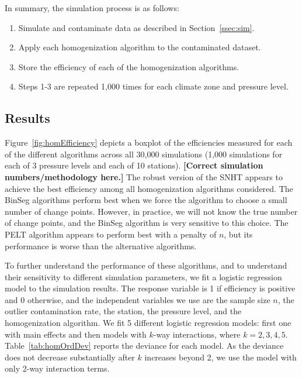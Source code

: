 \documentclass[12pt]{article}
\begin{document}
\begin{doublespacing}
In summary, the simulation process is as follows:

\begin{enumerate}
	\item Simulate and contaminate data as described in Section~\ref{ssec:sim}.
	\item Apply each homogenization algorithm to the contaminated dataset.
	\item Store the efficiency of each of the homogenization algorithms.
	\item Steps 1-3 are repeated 1,000 times for each climate zone and pressure level.
\end{enumerate}

\subsection{Results}

\label{sec:HomResults}


Figure~\ref{fig:homEfficiency} depicts a boxplot of the efficiencies measured for each of the different algorithms across all 30,000 simulations (1,000 simulations for each of 3 pressure levels and each of 10 stations).  \textbf{[Correct simulation numbers/methodology here.]}  The robust version of the SNHT appears to achieve the best efficiency among all homogenization algorithms considered.  The BinSeg algorithms perform best when we force the algorithm to choose a small number of change points.  However, in practice, we will not know the true number of change points, and the BinSeg algorithm is very sensitive to this choice.  The PELT algorithm appears to perform best with a penalty of $n$, but its performance is  worse than the alternative algorithms.

To further understand the performance of these algorithms, and to understand their sensitivity to different simulation parameters, we fit a logistic regression model to the simulation results.  The response variable is 1 if efficiency is positive and 0 otherwise, and the independent variables we use are the sample size $n$, the outlier contamination rate, the station, the pressure level, and the homogenization algorithm.  We fit 5 different logistic regression models: first one with main effects and then models with $k$-way interactions, where $k=2,3,4,5$.  Table~\ref{tab:homOrdDev} reports the deviance for each model.  As the deviance does not decrease substantially after $k$ increases beyond 2, we use the model with only 2-way interaction terms.


\end{doublespacing}
\end{document}
